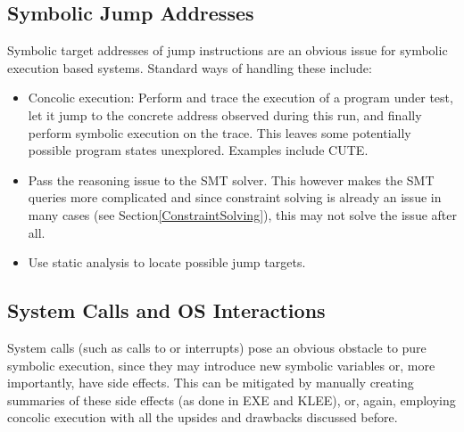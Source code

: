 \documentclass{article}
\begin{document}
\begin{multicols}{2}
    \subsection{Symbolic Jump Addresses}
    Symbolic target addresses of jump instructions are an obvious issue for symbolic execution based systems. Standard ways of handling these include:
    \begin{itemize}
        \item Concolic execution: Perform and trace the execution of a program under test, let it jump to the concrete address observed during this run, and finally perform symbolic execution on the trace. This leaves some potentially possible program states unexplored. Examples include CUTE\cite{CUTE}.
        \item Pass the reasoning issue to the SMT solver. This however makes the SMT queries more complicated and since constraint solving is already an issue in many cases (see Section\ref{ConstraintSolving}), this may not solve the issue after all.
        \item Use static analysis to locate possible jump targets.
    \end{itemize}

    \subsection{System Calls and OS Interactions}
    System calls (such as calls to  or interrupts) pose an obvious obstacle to pure symbolic execution, since they may introduce new symbolic variables or, more importantly, have side effects. This can be mitigated by manually creating summaries of these side effects (as done in EXE\cite{EXE} and KLEE\cite{KLEE}), or, again, employing concolic execution with all the upsides and drawbacks discussed before.


\end{multicols}
\end{document}
